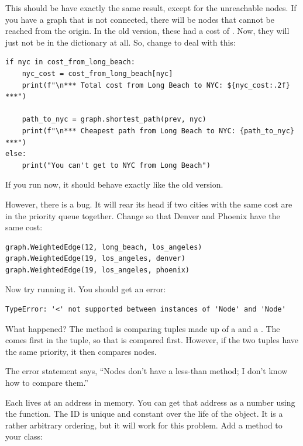 This should be have exactly the same result, except for the unreachable nodes.
If you have a graph that is not connected, there will be nodes that
cannot be reached from the origin.  In the old version, these had a
cost of .  Now, they will just not be in the dictionary at all.  So, change  to deal with this:

\begin{verbatim}
if nyc in cost_from_long_beach:
    nyc_cost = cost_from_long_beach[nyc]
    print(f"\n*** Total cost from Long Beach to NYC: ${nyc_cost:.2f} ***")

    path_to_nyc = graph.shortest_path(prev, nyc)
    print(f"\n*** Cheapest path from Long Beach to NYC: {path_to_nyc} ***")
else:
    print("You can't get to NYC from Long Beach")
\end{verbatim}

If you run  now, it should behave exactly like the old version.

However, there is a bug. It will rear its head if two cities with the same
cost are in the priority queue together.  Change 
so that Denver and Phoenix have the same cost:

\begin{verbatim}
graph.WeightedEdge(12, long_beach, los_angeles)
graph.WeightedEdge(19, los_angeles, denver)
graph.WeightedEdge(19, los_angeles, phoenix)
\end{verbatim}

Now try running it.  You should get an error:

\begin{verbatim}
TypeError: '<' not supported between instances of 'Node' and 'Node'
\end{verbatim}

What happened? The  method is comparing
tuples made up of a  and a .  The
 comes first in the tuple, so that is compared
first. However, if the two tuples have the same priority, it then
compares nodes.

The error statement says, ``Nodes don't have a less-than method; I don't
know how to compare them.''

Each  lives at an address in memory. You can get that
address as a number using the  function. The ID is
unique and constant over the life of the object. It is a rather
arbitrary ordering, but it will work for this problem.  Add a method to
your  class:

